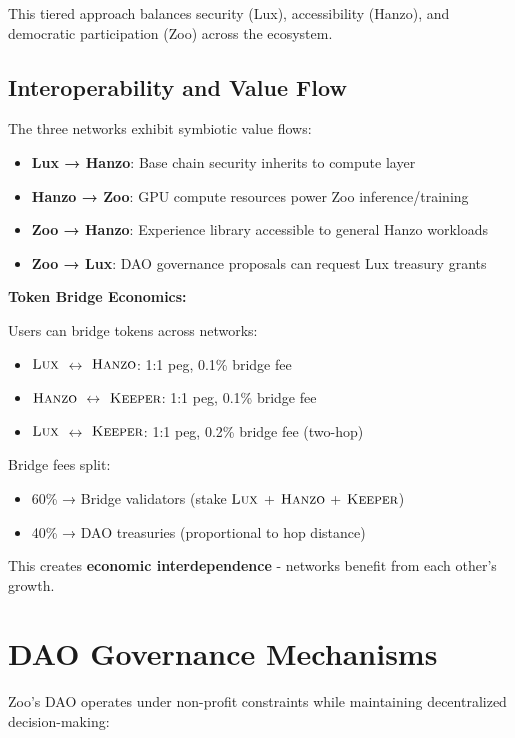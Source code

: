 \documentclass[11pt,letterpaper]{article}
\theoremstyle{definition}
\theoremstyle{remark}
\newcommand{\KEEPER}{\textsc{Keeper}}
\newcommand{\Hanzo}{\textsc{Hanzo}}
\newcommand{\Lux}{\textsc{Lux}}
\begin{document}
This tiered approach balances security (Lux), accessibility (Hanzo), and democratic participation (Zoo) across the ecosystem.

\subsection{Interoperability and Value Flow}

The three networks exhibit symbiotic value flows:

\begin{itemize}
\item \textbf{Lux → Hanzo}: Base chain security inherits to compute layer
\item \textbf{Hanzo → Zoo}: GPU compute resources power Zoo inference/training
\item \textbf{Zoo → Hanzo}: Experience library accessible to general Hanzo workloads
\item \textbf{Zoo → Lux}: DAO governance proposals can request Lux treasury grants
\end{itemize}

\textbf{Token Bridge Economics:}

Users can bridge tokens across networks:
\begin{itemize}
\item $\Lux$ $\leftrightarrow$ $\Hanzo$: 1:1 peg, 0.1\% bridge fee
\item $\Hanzo$ $\leftrightarrow$ $\KEEPER$: 1:1 peg, 0.1\% bridge fee
\item $\Lux$ $\leftrightarrow$ $\KEEPER$: 1:1 peg, 0.2\% bridge fee (two-hop)
\end{itemize}

Bridge fees split:
\begin{itemize}
\item 60\% → Bridge validators (stake $\Lux$ + $\Hanzo$ + $\KEEPER$)
\item 40\% → DAO treasuries (proportional to hop distance)
\end{itemize}

This creates \textbf{economic interdependence} - networks benefit from each other's growth.

\section{DAO Governance Mechanisms}

Zoo's DAO operates under non-profit constraints while maintaining decentralized decision-making:
\end{document}
